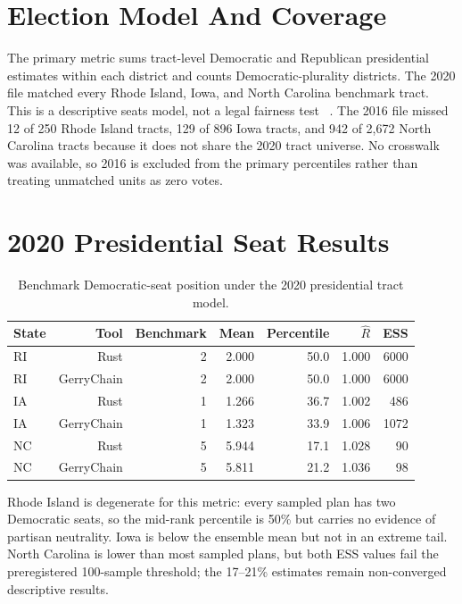 \section{Election Model And Coverage}

The primary metric sums tract-level Democratic and Republican presidential
estimates within each district and counts Democratic-plurality districts. The
2020 file matched every Rhode Island, Iowa, and North Carolina benchmark tract.
This is a descriptive seats model, not a legal fairness test
~\citep{stephanopoulos2015partisan,rodden2019why}.
The 2016 file missed 12 of 250 Rhode Island tracts, 129 of 896 Iowa tracts, and
942 of 2,672 North Carolina tracts because it does not share the 2020 tract
universe. No crosswalk was available, so 2016 is excluded from the primary
percentiles rather than treating unmatched units as zero votes.

\section{2020 Presidential Seat Results}

\begin{table}[h]
\centering
\caption{Benchmark Democratic-seat position under the 2020 presidential tract model.}
\begin{tabular}{lrrrrrr}
\toprule
State & Tool & Benchmark & Mean & Percentile & $\widehat R$ & ESS \\
\midrule
RI & Rust & 2 & 2.000 & 50.0 & 1.000 & 6000 \\
RI & GerryChain & 2 & 2.000 & 50.0 & 1.000 & 6000 \\
IA & Rust & 1 & 1.266 & 36.7 & 1.002 & 486 \\
IA & GerryChain & 1 & 1.323 & 33.9 & 1.006 & 1072 \\
NC & Rust & 5 & 5.944 & 17.1 & 1.028 & 90 \\
NC & GerryChain & 5 & 5.811 & 21.2 & 1.036 & 98 \\
\bottomrule
\end{tabular}
\end{table}

Rhode Island is degenerate for this metric: every sampled plan has two
Democratic seats, so the mid-rank percentile is 50\% but carries no evidence of
partisan neutrality. Iowa is below the ensemble mean but not in an extreme
tail. North Carolina is lower than most sampled plans, but both ESS values fail
the preregistered 100-sample threshold; the 17--21\% estimates remain
non-converged descriptive results.

